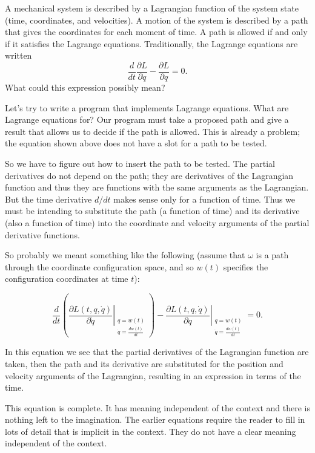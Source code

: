 \documentclass[11pt]{article}
\begin{document}
A mechanical system is described by a Lagrangian function of the system state
(time, coordinates, and velocities). A motion of the system is described by a
path that gives the coordinates for each moment of time. A path is allowed if
and only if it satisfies the Lagrange equations. Traditionally, the Lagrange
equations are written $${\frac{d}{dt}\frac{\partial L}{\partial \dot{q}}} -
\frac{\partial L}{\partial q}=0.$$ What could this expression possibly mean?

Let’s try to write a program that implements Lagrange equations. What are
Lagrange equations for? Our program must take a proposed path and give a result
that allows us to decide if the path is allowed. This is already a problem; the
equation shown above does not have a slot for a path to be tested.

So we have to figure out how to insert the path to be tested. The partial
derivatives do not depend on the path; they are derivatives of the Lagrangian
function and thus they are functions with the same arguments as the Lagrangian.
But the time derivative \(d/dt\) makes sense only for a function of time. Thus we
must be intending to substitute the path (a function of time) and its derivative
(also a function of time) into the coordinate and velocity arguments of the
partial derivative functions.

So probably we meant something like the following (assume that \(\omega\) is a
path through the coordinate configuration space, and so \(w(t)\) specifies the
configuration coordinates at time \(t\)):

$$\frac{d}{d t}\left( \left.\frac{\partial L(t, q, \dot{q})}{\partial \dot{q}}
\right|_{\substack{ {q=w(t)} \\ {\dot{q}=\frac{d w(t)}{d t}} }}
\right)-\left.\frac{\partial L(t, q, \dot{q})}{\partial q}\right|_{ \substack{
q=w(t) \\ {\dot{q}=\frac{d w(t)}{d t}}} }=0.$$

In this equation we see that the partial derivatives of the Lagrangian function
are taken, then the path and its derivative are substituted for the position and
velocity arguments of the Lagrangian, resulting in an expression in terms of the
time.

This equation is complete. It has meaning independent of the context and there
is nothing left to the imagination. The earlier equations require the reader to
fill in lots of detail that is implicit in the context. They do not have a clear
meaning independent of the context.
\end{document}
